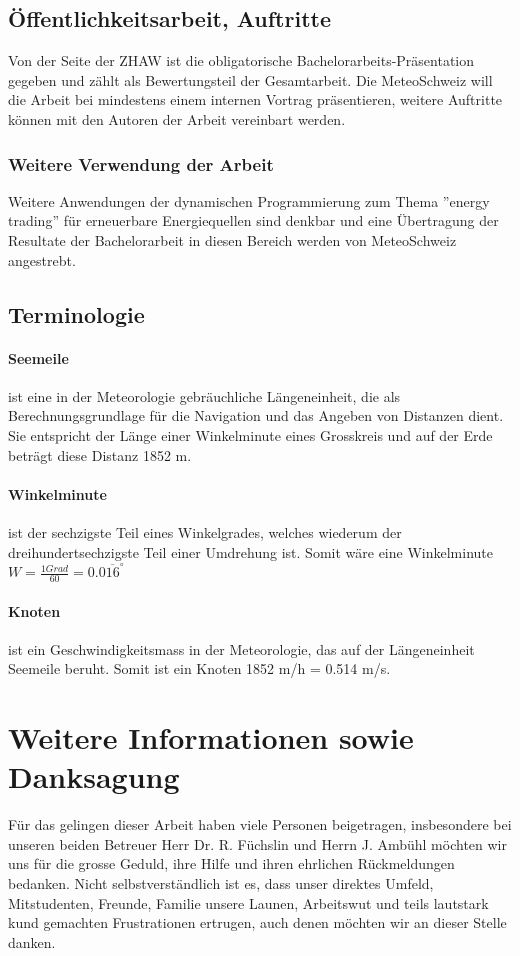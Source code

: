\documentclass[a4paper,10pt]{article}
\begin{document}
\subsection{Öffentlichkeitsarbeit, Auftritte}
Von der Seite der ZHAW ist die obligatorische Bachelorarbeits-Präsentation
gegeben und zählt als Bewertungsteil der Gesamtarbeit. Die MeteoSchweiz will
die Arbeit bei mindestens einem internen Vortrag präsentieren, weitere
Auftritte können mit den Autoren der Arbeit vereinbart werden.

\subsubsection{Weitere Verwendung der Arbeit}
Weitere Anwendungen der dynamischen Programmierung zum Thema ''energy
trading'' für erneuerbare Energiequellen sind denkbar und eine Übertragung der
Resultate der Bachelorarbeit in diesen Bereich werden von MeteoSchweiz
angestrebt.

\subsection{Terminologie}
\paragraph{Seemeile}ist eine in der Meteorologie gebräuchliche Längeneinheit,
die als Berechnungsgrundlage für die Navigation und das Angeben von Distanzen
dient. Sie entspricht der Länge einer Winkelminute eines Grosskreis und auf der
Erde beträgt diese Distanz 1852 m.

\paragraph{Winkelminute}ist der sechzigste Teil eines Winkelgrades, welches
wiederum der dreihundertsechzigste Teil einer Umdrehung ist. Somit wäre eine
Winkelminute \\ \( W=\frac{1 Grad}{60} = 0.0\overline{16}^\circ \)

\paragraph{Knoten}ist ein Geschwindigkeitsmass in der Meteorologie, das auf der
Längeneinheit Seemeile beruht. Somit ist ein Knoten 1852 m/h = 0.514 m/s.


\section{Weitere Informationen sowie Danksagung}
Für das gelingen dieser Arbeit haben viele Personen beigetragen, insbesondere
bei unseren beiden Betreuer Herr Dr. R. Füchslin und Herrn J. Ambühl möchten
wir uns für die grosse Geduld, ihre Hilfe und ihren ehrlichen Rückmeldungen
bedanken. Nicht selbstverständlich ist es, dass unser direktes Umfeld,
Mitstudenten, Freunde, Familie unsere Launen, Arbeitswut und teils lautstark
kund gemachten Frustrationen ertrugen, auch denen möchten wir an dieser Stelle
danken.
\end{document}
